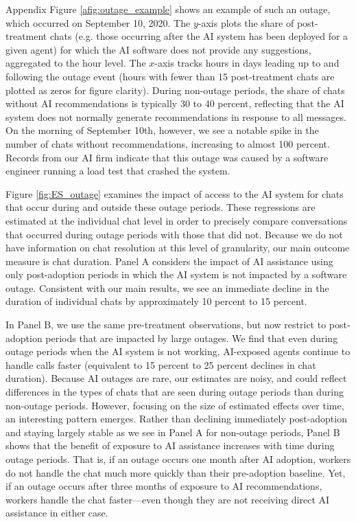 \documentclass[11pt]{article}
\begin{document}
Appendix Figure \ref{afig:outage_example} shows an example of such an outage, which occurred on September 10, 2020.  The $y$-axis plots the share of post-treatment chats (e.g. those occurring after the AI system has been deployed for a given agent) for which the AI software does not provide any suggestions, aggregated to the hour level.  The $x$-axis tracks hours in days leading up to and following the outage event (hours with fewer than 15 post-treatment chats are plotted as zeros for figure clarity).  During non-outage periods, the share of chats without AI recommendations is typically 30 to 40 percent, reflecting that the AI system does not normally generate recommendations in response to all messages.  On the morning of September 10th, however, we see a notable spike in the number of chats without recommendations, increasing to almost 100 percent. Records from our AI firm indicate that this outage was caused by a software engineer running a load test that crashed the system.   

Figure \ref{fig:ES_outage} examines the impact of access to the AI system for chats that occur during and outside these outage periods.  These regressions are estimated at the individual chat level in order to precisely compare conversations that occurred during outage periods with those that did not. Because we do not have information on chat resolution at this level of granularity, our main outcome measure is chat duration. Panel A considers the impact of AI assistance using only post-adoption periods in which the AI system is not impacted by a software outage.  Consistent with our main results, we see an immediate decline in the duration of individual chats by approximately 10 percent to 15 percent.  

In Panel B, we use the same pre-treatment observations, but now restrict to post-adoption periods that are impacted by large outages. We find that even during outage periods when the AI system is not working, AI-exposed agents continue to handle calls faster (equivalent to 15 percent to 25 percent declines in chat duration).  Because AI outages are rare, our estimates are noisy, and could reflect differences in the types of chats that are seen during outage periods than during non-outage periods. However, focusing on the size of estimated effects over time, an interesting pattern emerges.  Rather than declining immediately post-adoption and staying largely stable as we see in Panel A for non-outage periods, Panel B shows that the benefit of exposure to AI assistance increases with time during outage periods.  That is, if an outage occurs one month after AI adoption, workers do not handle the chat much more quickly than their pre-adoption baseline.  Yet, if an outage occurs after three months of exposure to AI recommendations, workers handle the chat faster---even though they are not receiving direct AI assistance in either case.  
\end{document}
